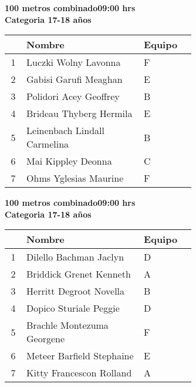 \begin{minipage}{0.95\linewidth}\vspace{0.5cm} 
\begin{flushleft}
\textbf{
\hspace{-0.15cm}100 metros combinado\hspace{1.5cm}09:00 hrs \\Categoria 17-18 años}\vspace{-0.2cm} 
\end{flushleft}
\begin{tabular}{cp{0.63\linewidth}l}
\hline
& \textbf{Nombre} & \textbf{Equipo} \\ \hline
1 & Luczki Wolny Lavonna & F \\ 
2 & Gabisi Garufi Meaghan & E \\ 
3 & Polidori Acey Geoffrey & B \\ 
4 & Brideau Thyberg Hermila & E \\ 
5 & Leinenbach Lindall Carmelina & B \\ 
6 & Mai Kippley Deonna & C \\ 
7 & Ohms Yglesias Maurine & F \\ 
\end{tabular}
\end{minipage}
\begin{minipage}{0.95\linewidth}\vspace{0.5cm} 
\begin{flushleft}
\textbf{
\hspace{-0.15cm}100 metros combinado\hspace{1.5cm}09:00 hrs \\Categoria 17-18 años}\vspace{-0.2cm} 
\end{flushleft}
\begin{tabular}{cp{0.63\linewidth}l}
\hline
& \textbf{Nombre} & \textbf{Equipo} \\ \hline
1 & Dilello Bachman Jaclyn & D \\ 
2 & Briddick Grenet Kenneth & A \\ 
3 & Herritt Degroot Novella & B \\ 
4 & Dopico Sturiale Peggie & D \\ 
5 & Brachle Montezuma Georgene & F \\ 
6 & Meteer Barfield Stephaine & E \\ 
7 & Kitty Francescon Rolland & A \\ 
\end{tabular}
\end{minipage}
